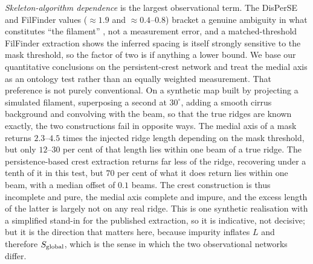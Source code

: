 \documentclass[usenatbib,twoside,twocolumn]{mnras}
\begin{document}
\emph{Skeleton-algorithm dependence} is the largest observational term. The DisPerSE and FilFinder values ($\approx1.9$ and $\approx0.4$--$0.8$) bracket a genuine ambiguity in what constitutes ``the filament'' , not a measurement error, and a matched-threshold FilFinder extraction shows the inferred spacing is itself strongly sensitive to the mask threshold, so the factor of two is if anything a lower bound. We base our quantitative conclusions on the persistent-crest network and treat the medial axis as an ontology test rather than an equally weighted measurement. That preference is not purely conventional. On a synthetic map built by projecting a simulated filament, superposing a second at $30^\circ$, adding a smooth cirrus background and convolving with the beam, so that the true ridges are known exactly, the two constructions fail in opposite ways. The medial axis of a mask returns $2.3$--$4.5$ times the injected ridge length depending on the mask threshold, but only $12$--$30$ per cent of that length lies within one beam of a true ridge. The persistence-based crest extraction returns far less of the ridge, recovering under a tenth of it in this test, but $70$ per cent of what it does return lies within one beam, with a median offset of $0.1$ beams. The crest construction is thus incomplete and pure, the medial axis complete and impure, and the excess length of the latter is largely not on any real ridge. This is one synthetic realisation with a simplified stand-in for the published extraction, so it is indicative, not decisive; but it is the direction that matters here, because impurity inflates $L$ and therefore $S_{\rm global}$, which is the sense in which the two observational networks differ.
\end{document}
